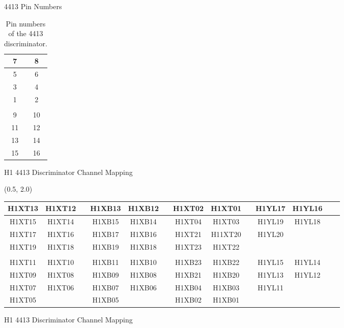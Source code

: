 \documentclass[10pt, xcolor={dvipsnames}, aspectratio = 169, sans,mathserif]{beamer}
\begin{document}
\begin{frame}{4413 Pin Numbers}

\begin{table}
\begin{center}
\begin{tabular}{ | c | c |}
\hline
7 & 8 \\
\hline
5 & 6 \\
\hline
3 & 4 \\
\hline
1 & 2 \\
\hline
 & \\
\hline
9 & 10 \\
\hline
11 & 12 \\
\hline
13 & 14 \\
\hline
15 & 16 \\
\hline
\end{tabular}
\caption{Pin numbers of the 4413 discriminator.}
\end{center}
\end{table}

\end{frame}

\begin{frame}{H1 4413 Discriminator Channel Mapping}

\begin{textblock}{14.0}(0.5, 2.0)
\begin{table}
\begin{tabular}{ | c | c | c | c | c | c | c | c | c | c | c | c | c |}
\hline
H1XT13 & H1XT12 & & H1XB13 & H1XB12 & & H1XT02 & H1XT01 & & H1YL17 & H1YL16 \\
\hline
H1XT15 & H1XT14 & & H1XB15 & H1XB14 & & H1XT04 & H1XT03 & & H1YL19 & H1YL18 \\
\hline
H1XT17 & H1XT16 & & H1XB17 & H1XB16 & & H1XT21 & H11XT20 & & H1YL20 & \\
\hline
H1XT19 & H1XT18 & & H1XB19 & H1XB18 & & H1XT23 & H1XT22 & & & \\
\hline
 & & & & & & & & & & \\
\hline
H1XT11 & H1XT10 & & H1XB11 & H1XB10 & & H1XB23 & H1XB22 & & H1YL15 & H1YL14 \\
\hline
H1XT09 & H1XT08 & & H1XB09 & H1XB08 & & H1XB21 & H1XB20 & & H1YL13 & H1YL12 \\
\hline
H1XT07 & H1XT06 & & H1XB07 & H1XB06 & & H1XB04 & H1XB03 & & H1YL11 & \\
\hline
H1XT05 &  &  & H1XB05 & & & H1XB02 & H1XB01 & & & \\
\hline
\end{tabular}
\end{table}
\end{textblock}

\end{frame}

\begin{frame}{H1 4413 Discriminator Channel Mapping}

\end{frame}
\end{document}
